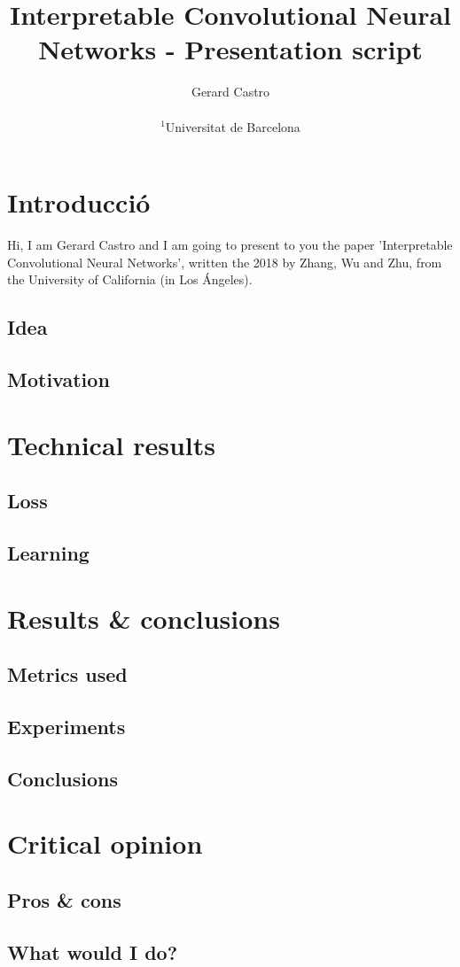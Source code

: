 \documentclass[12pt]{article}
\title{Interpretable Convolutional Neural Networks - Presentation script}
\author
{Gerard Castro\\
\\
\normalsize{$^{1}$Universitat de Barcelona}\\
}
\date{}
\begin{document}
 


\baselineskip19pt


\maketitle 

\section{Introducció}

Hi, I am Gerard Castro and I am going to present to you the paper 'Interpretable Convolutional Neural Networks', written the 2018 by Zhang, Wu and Zhu, from the University of California (in Los Ángeles).

\subsection{Idea}



\subsection{Motivation}

\section{Technical results}

\subsection{Loss}

\subsection{Learning}

\section{Results \& conclusions}

\subsection{Metrics used}

\subsection{Experiments}

\subsection{Conclusions}

\section{Critical opinion}

\subsection{Pros \& cons}

\subsection{What would I do?}
\end{document}
